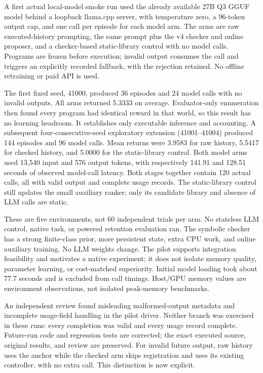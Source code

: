 A first actual local-model smoke run used the already available 27B Q3 GGUF model
behind a loopback llama.cpp server, with temperature zero, a 96-token output cap,
and one call per episode for each model arm. The arms are raw executed-history
prompting, the same prompt plus the v4 checker and online proposer, and a
checker-based static-library control with no model calls. Programs are frozen
before execution; invalid output consumes the call and triggers an explicitly recorded fallback,
with the rejection retained. No offline retraining or paid API is used.

The first fixed seed, 41000, produced 36 episodes and 24 model calls with no
invalid outputs. All arms returned 5.3333 on average. Evaluator-only enumeration
then found every program had identical reward in that world, so this result has
no learning headroom. It establishes only executable inference and accounting.
A subsequent four-consecutive-seed exploratory extension (41001--41004)
produced 144 episodes and 96 model calls. Mean returns were 3.9583 for raw
history, 5.5417 for checked history, and 5.0000 for the static-library control.
Both model arms used 13,540 input and 576 output tokens, with respectively
141.91 and 128.51 seconds of observed model-call latency. Both stages together
contain 120 actual calls, all with valid output and complete usage records.
The static-library control still updates the small auxiliary ranker; only its
candidate library and absence of LLM calls are static.

These are five environments, not 60 independent trials per arm. No stateless
LLM control, native task, or powered retention evaluation ran. The symbolic
checker has a strong finite-class prior, more persistent state, extra CPU work,
and online auxiliary training. No LLM weights change. The pilot supports
integration feasibility and motivates a native experiment; it does not isolate
memory quality, parameter learning, or cost-matched superiority. Initial model
loading took about 77.7 seconds and is excluded from call timings. Host/GPU
memory values are environment observations, not isolated peak-memory benchmarks.

An independent review found misleading malformed-output metadata and incomplete
usage-field handling in the pilot driver. Neither branch was exercised in these
runs: every completion was valid and every usage record complete. Future-run
code and regression tests are corrected; the exact executed source, original
results, and review are preserved. For invalid future output, raw history uses
the anchor while the checked arm skips registration and uses its existing
controller, with no extra call. This distinction is now explicit.
